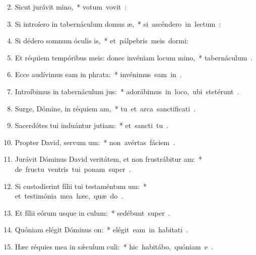 \begin{flushleft}
\begin{enumerate}[leftmargin=*]
\setcounter{enumi}{1}

\item Sicut jurávit mino,~* \mbox{votum vovit  :}
\item Si introíero in tabernáculum domus æ,~* \mbox{si ascéndero in lectum  :}
\item Si dédero somnum óculis is,~* \mbox{et pálpebris meis dormi:}
\item Et réquiem tempóribus meis: donec invéniam locum mino,~* \mbox{tabernáculum  .}
\item Ecce audívimus eam in phrata:~* \mbox{invénimus eam in  .}
\item Introíbimus in tabernáculum jus:~* \mbox{adorábimus in loco, ubi stetérunt  .}
\item Surge, Dómine, in réquiem am,~* \mbox{tu et arca sanctificati .}
\item Sacerdótes tui induántur jutiam:~* \mbox{et sancti tu .}
\item Propter David, servum um:~* \mbox{non avértas fáciem  .}
\item Jurávit Dóminus David veritátem, et non frustrábitur am:~* \mbox{de fructu ventris tui ponam super  .}
\item Si custodíerint fílii tui testaméntum um:~* \mbox{et testimónia mea hæc, quæ do .}
\item Et fílii eórum usque in culum:~* \mbox{sedébunt super  .}
\item Quóniam elégit Dóminus on:~* \mbox{elégit eam in habitati .}
\item Hæc réquies mea in s\'{\ae}culum culi:~* \mbox{hic habitábo, quóniam e .}

\end{enumerate}
\end{flushleft}
